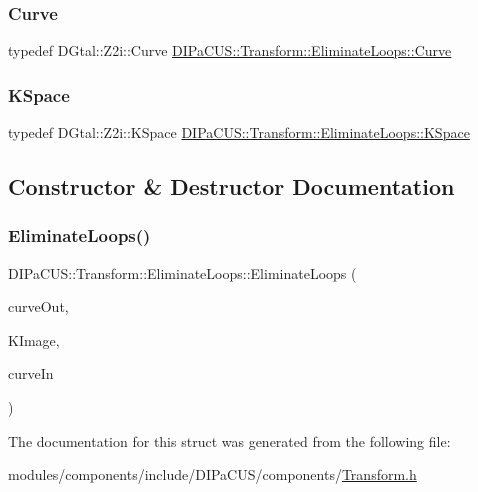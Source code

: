 \subsubsection{\texorpdfstring{Curve}{Curve}}
{\footnotesize\ttfamily typedef D\+Gtal\+::\+Z2i\+::\+Curve \mbox{\hyperlink{structDIPaCUS_1_1Transform_1_1EliminateLoops_a61f2dc2fd24bfb776edbd6358e128e03}{D\+I\+Pa\+C\+U\+S\+::\+Transform\+::\+Eliminate\+Loops\+::\+Curve}}}

\mbox{\label{structDIPaCUS_1_1Transform_1_1EliminateLoops_aed679a455575ffdf2c1e5140fdb451fe}} 
\subsubsection{\texorpdfstring{K\+Space}{KSpace}}
{\footnotesize\ttfamily typedef D\+Gtal\+::\+Z2i\+::\+K\+Space \mbox{\hyperlink{structDIPaCUS_1_1Transform_1_1EliminateLoops_aed679a455575ffdf2c1e5140fdb451fe}{D\+I\+Pa\+C\+U\+S\+::\+Transform\+::\+Eliminate\+Loops\+::\+K\+Space}}}



\subsection{Constructor \& Destructor Documentation}
\mbox{\label{structDIPaCUS_1_1Transform_1_1EliminateLoops_a5054417882a5fb8867d237ca11eb5867}} 
\subsubsection{\texorpdfstring{Eliminate\+Loops()}{EliminateLoops()}}
{\footnotesize\ttfamily D\+I\+Pa\+C\+U\+S\+::\+Transform\+::\+Eliminate\+Loops\+::\+Eliminate\+Loops (\begin{DoxyParamCaption}\item[{\mbox{\hyperlink{structDIPaCUS_1_1Transform_1_1EliminateLoops_a61f2dc2fd24bfb776edbd6358e128e03}{Curve}} \&}]{curve\+Out,  }\item[{\mbox{\hyperlink{structDIPaCUS_1_1Transform_1_1EliminateLoops_aed679a455575ffdf2c1e5140fdb451fe}{K\+Space}} \&}]{K\+Image,  }\item[{\mbox{\hyperlink{structDIPaCUS_1_1Transform_1_1EliminateLoops_a61f2dc2fd24bfb776edbd6358e128e03}{Curve}} \&}]{curve\+In }\end{DoxyParamCaption})}



The documentation for this struct was generated from the following file\+:\begin{DoxyCompactItemize}
\item 
modules/components/include/\+D\+I\+Pa\+C\+U\+S/components/\mbox{\hyperlink{Transform_8h}{Transform.\+h}}\end{DoxyCompactItemize}
